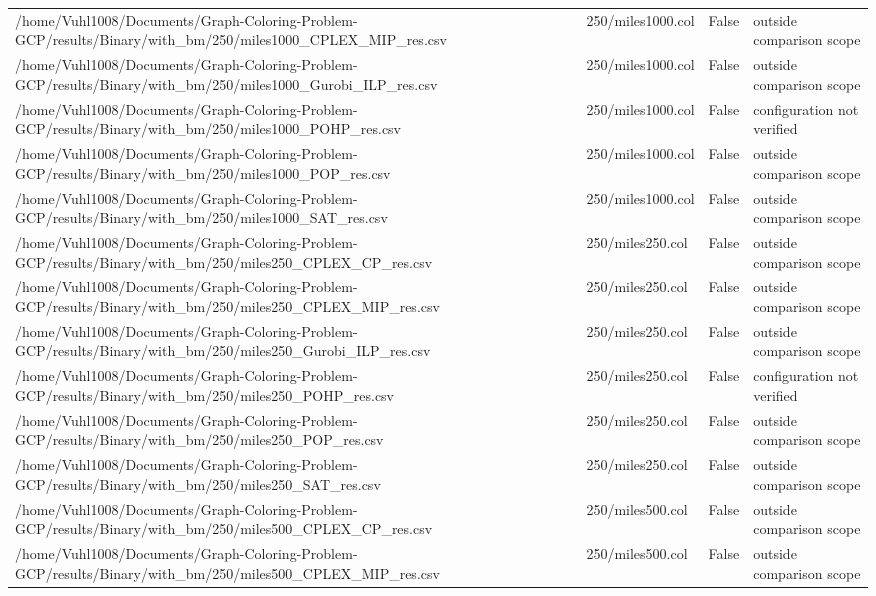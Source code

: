 \begin{table}[htbp]
\begin{tabular}{llll}
/home/Vuhl1008/Documents/Graph-Coloring-Problem-GCP/results/Binary/with\_bm/250/miles1000\_CPLEX\_MIP\_res.csv & 250/miles1000.col & False & outside comparison scope \\
/home/Vuhl1008/Documents/Graph-Coloring-Problem-GCP/results/Binary/with\_bm/250/miles1000\_Gurobi\_ILP\_res.csv & 250/miles1000.col & False & outside comparison scope \\
/home/Vuhl1008/Documents/Graph-Coloring-Problem-GCP/results/Binary/with\_bm/250/miles1000\_POHP\_res.csv & 250/miles1000.col & False & configuration not verified \\
/home/Vuhl1008/Documents/Graph-Coloring-Problem-GCP/results/Binary/with\_bm/250/miles1000\_POP\_res.csv & 250/miles1000.col & False & outside comparison scope \\
/home/Vuhl1008/Documents/Graph-Coloring-Problem-GCP/results/Binary/with\_bm/250/miles1000\_SAT\_res.csv & 250/miles1000.col & False & outside comparison scope \\
/home/Vuhl1008/Documents/Graph-Coloring-Problem-GCP/results/Binary/with\_bm/250/miles250\_CPLEX\_CP\_res.csv & 250/miles250.col & False & outside comparison scope \\
/home/Vuhl1008/Documents/Graph-Coloring-Problem-GCP/results/Binary/with\_bm/250/miles250\_CPLEX\_MIP\_res.csv & 250/miles250.col & False & outside comparison scope \\
/home/Vuhl1008/Documents/Graph-Coloring-Problem-GCP/results/Binary/with\_bm/250/miles250\_Gurobi\_ILP\_res.csv & 250/miles250.col & False & outside comparison scope \\
/home/Vuhl1008/Documents/Graph-Coloring-Problem-GCP/results/Binary/with\_bm/250/miles250\_POHP\_res.csv & 250/miles250.col & False & configuration not verified \\
/home/Vuhl1008/Documents/Graph-Coloring-Problem-GCP/results/Binary/with\_bm/250/miles250\_POP\_res.csv & 250/miles250.col & False & outside comparison scope \\
/home/Vuhl1008/Documents/Graph-Coloring-Problem-GCP/results/Binary/with\_bm/250/miles250\_SAT\_res.csv & 250/miles250.col & False & outside comparison scope \\
/home/Vuhl1008/Documents/Graph-Coloring-Problem-GCP/results/Binary/with\_bm/250/miles500\_CPLEX\_CP\_res.csv & 250/miles500.col & False & outside comparison scope \\
/home/Vuhl1008/Documents/Graph-Coloring-Problem-GCP/results/Binary/with\_bm/250/miles500\_CPLEX\_MIP\_res.csv & 250/miles500.col & False & outside comparison scope \\

\end{tabular}
\end{table}
